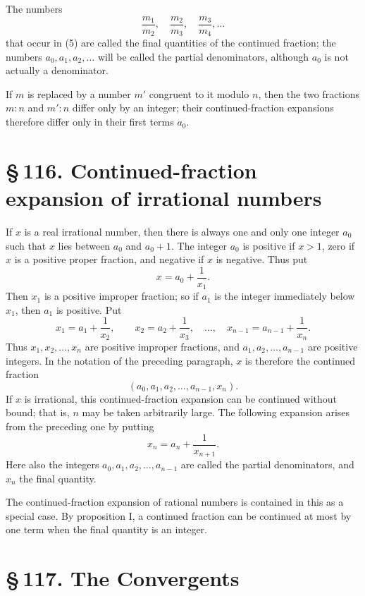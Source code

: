 \documentclass[11pt]{article}
\providecommand{\sect}[2]{\section*{\S\,#1. #2}}
\begin{document}
The numbers
\[
        \frac{m_1}{m_2},\quad \frac{m_2}{m_3},\quad \frac{m_3}{m_4},\ldots
\]
that occur in (5) are called the final quantities of the continued fraction; the numbers $a_0,a_1,a_2,\ldots$ will be called the partial denominators, although $a_0$ is not actually a denominator.

If $m$ is replaced by a number $m'$ congruent to it modulo $n$, then the two fractions $m:n$ and $m':n$ differ only by an integer; their continued-fraction expansions therefore differ only in their first terms $a_0$.

\sect{116}{Continued-fraction expansion of irrational numbers}

If $x$ is a real irrational number, then there is always one and only one integer $a_0$ such that $x$ lies between $a_0$ and $a_0+1$. The integer $a_0$ is positive if $x>1$, zero if $x$ is a positive proper fraction, and negative if $x$ is negative. Thus put
\[
        x=a_0+\frac1{x_1}.
\]
Then $x_1$ is a positive improper fraction; so if $a_1$ is the integer immediately below $x_1$, then $a_1$ is positive. Put
\[
        x_1=a_1+\frac1{x_2},\qquad
        x_2=a_2+\frac1{x_3},\quad\ldots,\quad
        x_{n-1}=a_{n-1}+\frac1{x_n}.
\]
Thus $x_1,x_2,\ldots,x_n$ are positive improper fractions, and $a_1,a_2,\ldots,a_{n-1}$ are positive integers. In the notation of the preceding paragraph, $x$ is therefore the continued fraction
\[
        (a_0,a_1,a_2,\ldots,a_{n-1},x_n).
\]
If $x$ is irrational, this continued-fraction expansion can be continued without bound; that is, $n$ may be taken arbitrarily large. The following expansion arises from the preceding one by putting
\[
        x_n=a_n+\frac1{x_{n+1}}.
\]
Here also the integers $a_0,a_1,a_2,\ldots,a_{n-1}$ are called the partial denominators, and $x_n$ the final quantity.

The continued-fraction expansion of rational numbers is contained in this as a special case. By proposition I, a continued fraction can be continued at most by one term when the final quantity is an integer.


\sect{117}{The Convergents}
\end{document}
